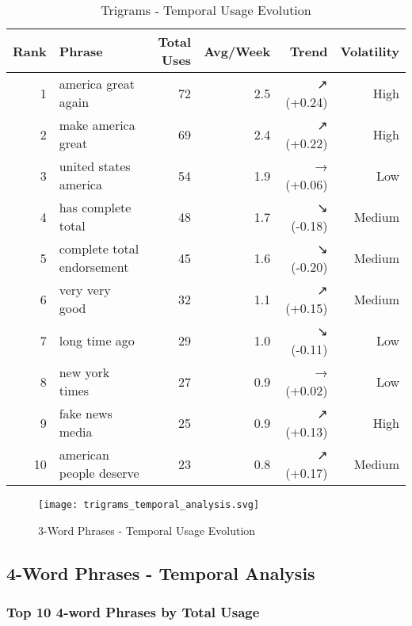 \documentclass[12pt,a4paper]{article}
\begin{document}
\begin{table}[H]
\centering
\caption{Trigrams - Temporal Usage Evolution}
\begin{tabular}{@{}rlrrrr@{}}
\toprule
\textbf{Rank} & \textbf{Phrase} & \textbf{Total Uses} & \textbf{Avg/Week} & \textbf{Trend} & \textbf{Volatility} \\
\midrule
1 & america great again & 72 & 2.5 & ↗ (+0.24) & High \\
2 & make america great & 69 & 2.4 & ↗ (+0.22) & High \\
3 & united states america & 54 & 1.9 & → (+0.06) & Low \\
4 & has complete total & 48 & 1.7 & ↘ (-0.18) & Medium \\
5 & complete total endorsement & 45 & 1.6 & ↘ (-0.20) & Medium \\
6 & very very good & 32 & 1.1 & ↗ (+0.15) & Medium \\
7 & long time ago & 29 & 1.0 & ↘ (-0.11) & Low \\
8 & new york times & 27 & 0.9 & → (+0.02) & Low \\
9 & fake news media & 25 & 0.9 & ↗ (+0.13) & High \\
10 & american people deserve & 23 & 0.8 & ↗ (+0.17) & Medium \\
\bottomrule
\end{tabular}
\end{table}

\begin{figure}[H]
\centering
\texttt{[image: trigrams\_temporal\_analysis.svg]}
\caption{3-Word Phrases - Temporal Usage Evolution}
\label{fig:trigrams_temporal}
\end{figure}

\subsection{4-Word Phrases - Temporal Analysis}

\subsubsection{Top 10 4-word Phrases by Total Usage}
\end{document}
